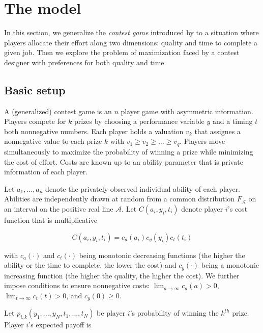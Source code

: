 \documentclass[12pt,]{article}
\begin{document}
\section{The model}\label{the-model}

In this section, we generalize the \emph{contest game} introduced by
\citet{moldovanu2001optimal} to a situation where players allocate their
effort along two dimensions: quality and time to complete a given job.
Then we explore the problem of maximization faced by a contest designer
with preferences for both quality and time.

\subsection{Basic setup}\label{basic-setup}

A (generalized) contest game is an \(n\) player game with asymmetric
information. Players compete for \(k\) prizes by choosing a performance
variable \(y\) and a timing \(t\) both nonnegative numbers. Each player
holds a valuation \(v_k\) that assignes a nonnegative value to each
prize \(k\) with \(v_1\geq v_2 \geq ...\geq v_q\). Players move
simultaneously to maximize the probability of winning a prize while
minimizing the cost of effort. Costs are known up to an ability
parameter that is private information of each player.

Let \(a_1, ..., a_n\) denote the privately observed individual ability
of each player. Abilities are independently drawn at random from a
common distribution \(F_{\mathcal{A}}\) on an interval on the positive
real line \(\mathcal{A}\). Let \(C(a_i, y_i, t_i)\) denote player
\(i\)'s cost function that is multiplicative

\begin{equation}
  C(a_i, y_i, t_i) = c_a(a_i) c_y(y_i) c_t(t_i)
\end{equation}

with \(c_a(\cdot)\) and \(c_t(\cdot)\) being monotonic decreasing
functions (the higher the ability or the time to complete, the lower the
cost) and \(c_{y}(\cdot)\) being a monotonic increasing function (the
higher the quality, the higher the cost). We further impose conditions
to ensure nonnegative costs: \(\lim_{a\rightarrow \infty}c_{a}(a)>0\),
\(\lim_{t\rightarrow \infty}c_{t}(t)>0\), and \(c_{y}(0)\geq 0\).

Let \(p_{i, k}(y_1,..., y_N, t_1, ..., t_N)\) be player \(i\)'s
probability of winning the \(k^{th}\) prize. Player \(i\)'s expected
payoff is
\end{document}
